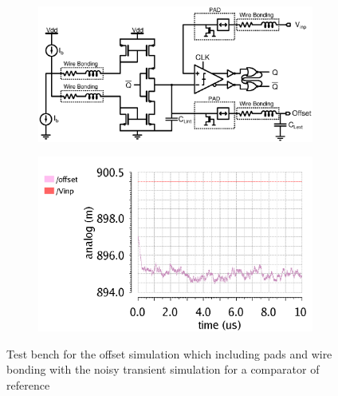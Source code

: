 \begin{figure}[htp]
    \centering
    \begin{subfigure}[b]{0.49\textwidth}
        \includegraphics[width=\textwidth]{Chapter5/Figs/comp_test/feedback_offset_comp_principle.ps}
    \end{subfigure}
    \begin{subfigure}[b]{0.45\textwidth}
        \includegraphics[width=\textwidth]{Chapter5/Figs/comp_test/fb_comp_offset_ref_res.png}
    \end{subfigure}
    \caption{Test bench for the offset simulation which including pads and wire bonding with the noisy transient simulation for a comparator of reference}
    \label{fig:tb_fb_comp_offset}
\end{figure}

